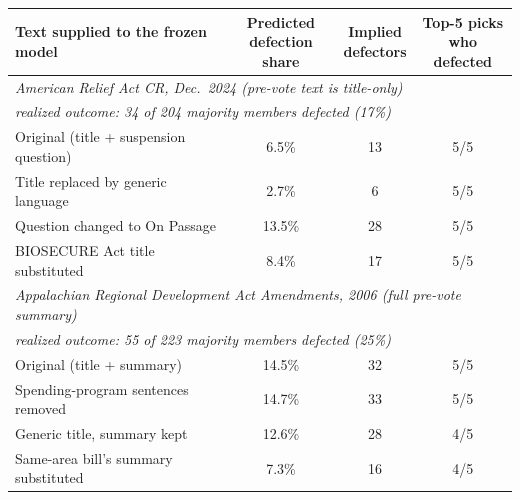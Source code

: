 \begin{tabular}{p{7.6cm}ccc}
\toprule
Text supplied to the frozen model & \shortstack{Predicted\\defection share} & \shortstack{Implied\\defectors} & \shortstack{Top-5 picks\\who defected} \\
\midrule
\multicolumn{4}{l}{\emph{American Relief Act CR, Dec.\ 2024 (pre-vote text is title-only)}} \\
\multicolumn{4}{l}{\quad\emph{realized outcome: 34 of 204 majority members defected (17\%)}} \\
\quad Original (title + suspension question) & 6.5\% & 13 & 5/5 \\
\quad Title replaced by generic language & 2.7\% & 6 & 5/5 \\
\quad Question changed to On Passage & 13.5\% & 28 & 5/5 \\
\quad BIOSECURE Act title substituted & 8.4\% & 17 & 5/5 \\
\multicolumn{4}{l}{\emph{Appalachian Regional Development Act Amendments, 2006 (full pre-vote summary)}} \\
\multicolumn{4}{l}{\quad\emph{realized outcome: 55 of 223 majority members defected (25\%)}} \\
\quad Original (title + summary) & 14.5\% & 32 & 5/5 \\
\quad Spending-program sentences removed & 14.7\% & 33 & 5/5 \\
\quad Generic title, summary kept & 12.6\% & 28 & 4/5 \\
\quad Same-area bill's summary substituted & 7.3\% & 16 & 4/5 \\
\bottomrule
\end{tabular}
